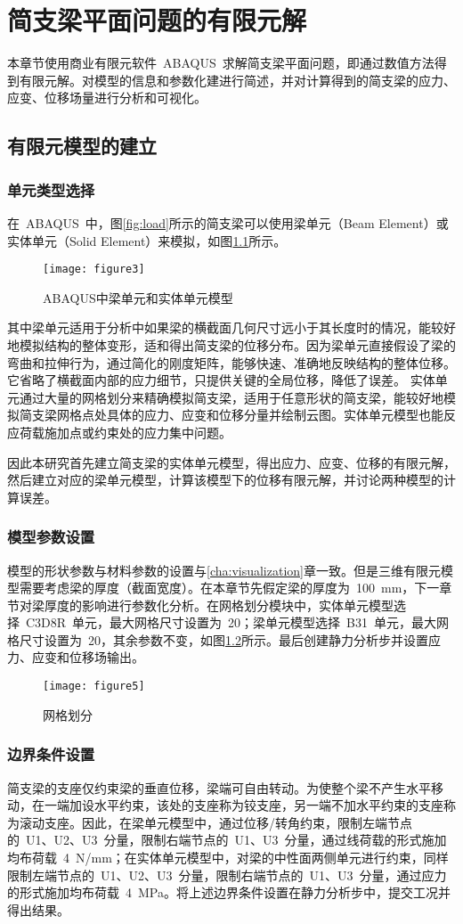 \chapter{简支梁平面问题的有限元解}
\label{cha:FEAsolution}
本章节使用商业有限元软件~ABAQUS~求解简支梁平面问题，即通过数值方法得到有限元解。对模型的信息和参数化建进行简述，并对计算得到的简支梁的应力、应变、位移场量进行分析和可视化。
\section{有限元模型的建立}
\subsection{单元类型选择}
在~ABAQUS~中，图\ref{fig:load}所示的简支梁可以使用梁单元（Beam Element）或实体单元（Solid Element）来模拟，如图\ref{fig:models}所示。
\begin{figure}[htbp]
    \centering
	\texttt{[image: figure3]}
    \caption{ABAQUS中梁单元和实体单元模型}
    \label{fig:models}
\end{figure}
其中梁单元适用于分析中如果梁的横截面几何尺寸远小于其长度时的情况，能较好地模拟结构的整体变形，适和得出简支梁的位移分布。因为梁单元直接假设了梁的弯曲和拉伸行为，通过简化的刚度矩阵，能够快速、准确地反映结构的整体位移。它省略了横截面内部的应力细节，只提供关键的全局位移，降低了误差。
实体单元通过大量的网格划分来精确模拟简支梁，适用于任意形状的简支梁，能较好地模拟简支梁网格点处具体的应力、应变和位移分量并绘制云图。实体单元模型也能反应荷载施加点或约束处的应力集中问题。

因此本研究首先建立简支梁的实体单元模型，得出应力、应变、位移的有限元解，然后建立对应的梁单元模型，计算该模型下的位移有限元解，并讨论两种模型的计算误差。
\subsection{模型参数设置}
模型的形状参数与材料参数的设置与\ref{cha:visualization}章一致。但是三维有限元模型需要考虑梁的厚度（截面宽度）。在本章节先假定梁的厚度为~100~mm，下一章节对梁厚度的影响进行参数化分析。在网格划分模块中，实体单元模型选择~C3D8R~单元，最大网格尺寸设置为~20；梁单元模型选择~B31~单元，最大网格尺寸设置为~20，其余参数不变，如图\ref{fig:mesh}所示。最后创建静力分析步并设置应力、应变和位移场输出。
\begin{figure}[htbp]
    \centering
	\texttt{[image: figure5]}
    \caption{网格划分}
    \label{fig:mesh}
\end{figure}
\subsection{边界条件设置}
简支梁的支座仅约束梁的垂直位移，梁端可自由转动。为使整个梁不产生水平移动，在一端加设水平约束，该处的支座称为铰支座，另一端不加水平约束的支座称为滚动支座。因此，在梁单元模型中，通过位移/转角约束，限制左端节点的~U1、U2、U3~分量，限制右端节点的~U1、U3~分量，通过线荷载的形式施加均布荷载~4~N/mm；在实体单元模型中，对梁的中性面两侧单元进行约束，同样限制左端节点的~U1、U2、U3~分量，限制右端节点的~U1、U3~分量，通过应力的形式施加均布荷载~4~MPa。将上述边界条件设置在静力分析步中，提交工况并得出结果。

